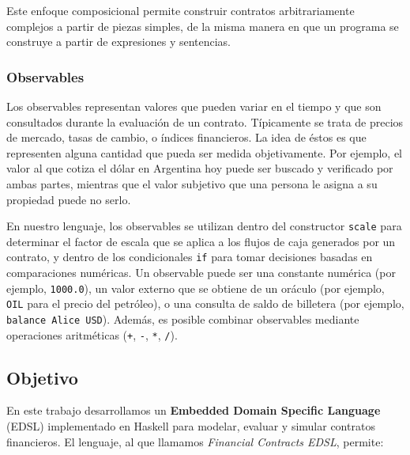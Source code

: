 \documentclass[a4paper, 12pt]{article}
\begin{document}
Este enfoque composicional permite construir contratos arbitrariamente complejos a partir de piezas simples, de la misma manera en que un programa se construye a partir de expresiones y sentencias.

\subsubsection{Observables}

Los observables representan valores que pueden variar en el tiempo y que son consultados durante la evaluación de un contrato. Típicamente se trata de precios de mercado, tasas de cambio, o índices financieros. La idea de éstos es que representen alguna cantidad que pueda ser medida objetivamente. Por ejemplo, el valor al que cotiza el dólar en Argentina hoy puede ser buscado y verificado por ambas partes, mientras que el valor subjetivo que una persona le asigna a su propiedad puede no serlo.

En nuestro lenguaje, los observables se utilizan dentro del constructor \texttt{scale} para determinar el factor de escala que se aplica a los flujos de caja generados por un contrato, y dentro de los condicionales \texttt{if} para tomar decisiones basadas en comparaciones numéricas.
Un observable puede ser una constante numérica (por ejemplo, \texttt{1000.0}), un valor externo que se obtiene de un oráculo (por ejemplo, \texttt{OIL} para el precio del petróleo), o una consulta de saldo de billetera (por ejemplo, \texttt{balance Alice USD}). Además, es posible combinar observables mediante operaciones aritméticas (\texttt{+}, \texttt{-}, \texttt{*}, \texttt{/}).

\subsection{Objetivo}

En este trabajo desarrollamos un \textbf{Embedded Domain Specific Language} (EDSL) implementado en Haskell para modelar, evaluar y simular contratos financieros. El lenguaje, al que llamamos \textit{Financial Contracts EDSL}, permite:
\end{document}
